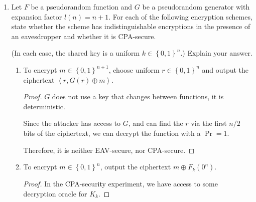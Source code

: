 \documentclass{article}
\DeclareMathOperator{\PrivK}{\textsf{PrivK}}
\begin{document}
\begin{enumerate}
\begin{enumerate}
\begin{proof}
          Thus, we have that
          \[
            \left| \Pr\left[\PrivK_{\mathcal{A}, \Pi}^\text{cpa}(n/2) = 1\right] - 
            \Pr\left[\PrivK_{\mathcal{A}, \Pi\prime}^\text{cpa}(n/2) \right] =
            1\right| \leq \frac{q(n)}{2^n} + \frac{1}{2} + \textsf{negl}(n)
          \]

          And since there exists some negligible function, we have that the
          scheme is CPA-secure.
        \end{proof}
    \end{enumerate}
    
  \item Let $F$ be a pseudorandom function and $G$ be a pseudorandom generator
    with expansion factor $l(n) = n + 1$. For each of the following encryption
    schemes, state whether the scheme has indistinguishable encryptions in the
    presence of an eavesdropper and whether it is CPA-secure.

    (In each case, the shared key is a uniform $k \in \left\{0, 1\right\}^n$.)
    Explain your answer.


    \begin{enumerate}
      \item To encrypt $m \in \left\{0, 1\right\}^{n + 1}$, choose uniform $r
        \in \left\{0, 1\right\}^n$ and output the ciphertext $\left\langle r,
          G(r) \oplus m\right\rangle$.

          \begin{proof}
            $G$ does not use a key that changes between functions, it is
            deterministic.

            Since the attacker has access to $G$, and can find the $r$ via the
            first $n / 2$ bits of the ciphertext, we can decrypt the function
            with a $\Pr = 1$.

            Therefore, it is neither EAV-secure, nor CPA-secure.
          \end{proof}

        \item To encrypt $m \in \left\{0, 1\right\}^n$, output the ciphertext $m
          \oplus F_k(0^n)$.

          \begin{proof}
            In the CPA-security experiment, we have access to some decryption
            oracle for $K_k$.


\end{proof}
\end{enumerate}
\end{enumerate}
\end{document}
